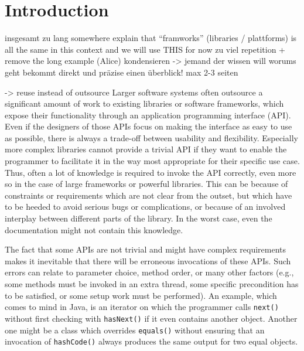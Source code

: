 \chapter{Introduction}\label{ch:intro}

insgesamt zu lang
somewhere explain that ``framworks'' (libraries / plattforms) is all the same in this context and we will use THIS for now
zu viel repetition + remove the long example (Alice)
kondensieren -> jemand der wissen will worums geht bekommt direkt und präzise einen überblick!
max 2-3 seiten


-> reuse instead of outsource
Larger software systems often outsource a significant amount of work to existing libraries or software frameworks, which expose their functionality through an application programming interface (API).
Even if the designers of those APIs focus on making the interface as easy to use as possible, there is always a trade-off between usability and flexibility.
Especially more complex libraries cannot provide a trivial API if they want to enable the programmer to facilitate it in the way most appropriate for their specific use case.
Thus, often a lot of knowledge is required to invoke the API correctly, even more so in the case of large frameworks or powerful libraries.
This can be because of constraints or requirements which are not clear from the outset, but which have to be heeded to avoid serious bugs or complications, or because of an involved interplay between different parts of the library.
In the worst case, even the documentation might not contain this knowledge.

The fact that some APIs are not trivial and might have complex requirements makes it inevitable that there will be erroneous invocations of these APIs.
Such errors can relate to parameter choice, method order, or many other factors (e.g., some methods must be invoked in an extra thread, some specific precondition has to be satisfied, or some setup work must be performed).
An example, which comes to mind in Java, is an iterator on which the programmer calls \texttt{next()} without first checking with \texttt{hasNext()} if it even contains another object.
Another one might be a class which overrides \texttt{equals()} without ensuring that an invocation of \texttt{hashCode()} always produces the same output for two equal objects.

